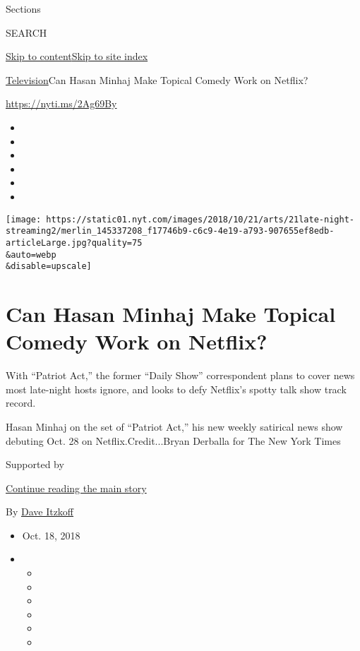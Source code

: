 Sections

SEARCH

\protect\hyperlink{site-content}{Skip to
content}\protect\hyperlink{site-index}{Skip to site index}

\href{/section/arts/television}{Television}\textbar{}Can Hasan Minhaj
Make Topical Comedy Work on Netflix?

\href{https://nyti.ms/2Ag69By}{https://nyti.ms/2Ag69By}

\begin{itemize}
\item
\item
\item
\item
\item
\item
\end{itemize}

\texttt{[image: https://static01.nyt.com/images/2018/10/21/arts/21late-night-streaming2/merlin\_145337208\_f17746b9-c6c9-4e19-a793-907655ef8edb-articleLarge.jpg?quality=75\\\&auto=webp\\\&disable=upscale]}

\hypertarget{can-hasan-minhaj-make-topical-comedy-work-on-netflix}{%
\section{Can Hasan Minhaj Make Topical Comedy Work on
Netflix?}\label{can-hasan-minhaj-make-topical-comedy-work-on-netflix}}

With ``Patriot Act,'' the former ``Daily Show'' correspondent plans to
cover news most late-night hosts ignore, and looks to defy Netflix's
spotty talk show track record.

Hasan Minhaj on the set of ``Patriot Act,'' his new weekly satirical
news show debuting Oct. 28 on Netflix.Credit...Bryan Derballa for The
New York Times

Supported by

\protect\hyperlink{after-sponsor}{Continue reading the main story}

By \href{https://www.nytimes.com/by/dave-itzkoff}{Dave Itzkoff}

\begin{itemize}
\item
  Oct. 18, 2018
\item
  \begin{itemize}
  \item
  \item
  \item
  \item
  \item
  \item
  \end{itemize}
\end{itemize}

